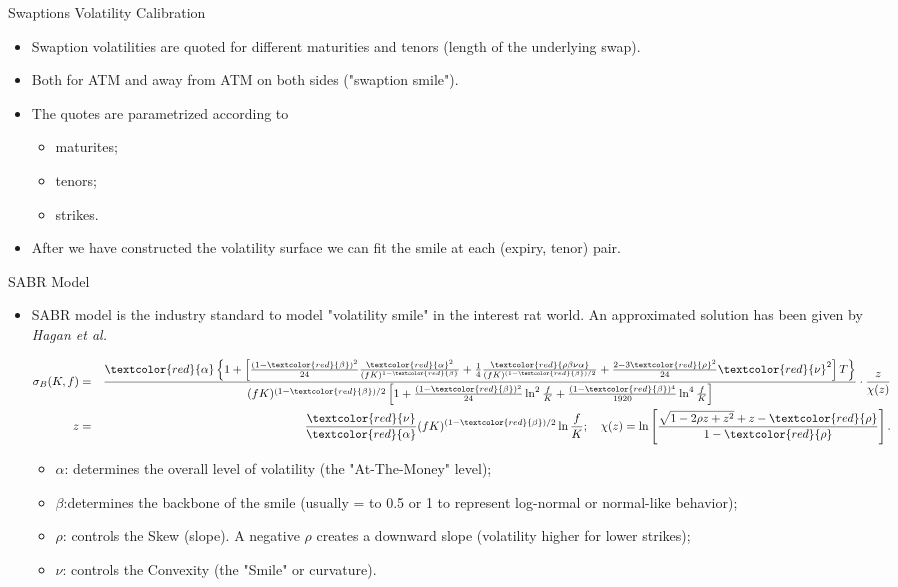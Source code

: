 \documentclass{beamer}
\begin{document}
\begin{frame}{Swaptions Volatility Calibration}
\begin{itemize}
\item Swaption volatilities are quoted for different maturities and tenors (length of the underlying swap).
\item Both for ATM and away from ATM on both sides ("swaption smile").
\item The quotes are parametrized according to
\begin{itemize}
	\item maturites;
	\item tenors;
	\item strikes.
\end{itemize}
\item After we have constructed the volatility surface we can fit the smile at each (expiry, tenor) pair.
\end{itemize}
\end{frame}

\begin{frame}{SABR Model}
\begin{itemize}
\item SABR model is the industry standard to model "volatility smile" in the interest rat world. An approximated solution has been given by \emph{Hagan et al.}

\begin{eqnarray} \sigma _{B}(K,f) &=&\frac{\textcolor{red}{\alpha} \left\{ 1+\left[ \frac{\left( 1-\textcolor{red}{\beta} \right) ^{2}}{24}\frac{\textcolor{red}{\alpha} ^{2}}{(fK)^{1-\textcolor{red}{\beta}}}+\frac{1}{4}\frac{\textcolor{red}{\rho \beta \nu\alpha}}{(fK)^{(1-\textcolor{red}{\beta})/2}}+\frac{2-3\textcolor{red}{\rho} ^{2}}{24}\textcolor{red}{\nu}^{2}\right] T\right\} }{(fK)^{(1-\textcolor{red}{\beta})/2}\left[ 1+\frac{(1-\textcolor{red}{\beta})^{2}}{24}\ln ^{2} \frac{f}{K}+\frac{(1-\textcolor{red}{\beta})^{4}}{1920}\ln^{4}\frac{f}{K}\right] } \cdot \frac{z}{\chi (z)} \notag \\ z &=&\frac{\textcolor{red}{\nu}}{\textcolor{red}{\alpha}}(fK)^{(1-\textcolor{red}{\beta})/2}\ln \frac{f}{K};\quad \notag \chi (z) =\ln \left[ \frac{\sqrt{1-2\rho z+z^{2}}+z-\textcolor{red}{\rho}}{1-\textcolor{red}{\rho}}\right] . \notag \end{eqnarray}

\begin{itemize}
	\item $\alpha$: determines the overall level of volatility (the "At-The-Money" level);
	\item $\beta$:determines the backbone of the smile (usually = to 0.5 or 1 to represent log-normal or normal-like behavior);
	\item $\rho$: controls the Skew (slope). A negative $\rho$ creates a downward slope (volatility higher for lower strikes);
	\item $\nu$: controls the Convexity (the "Smile" or curvature).
\end{itemize}
\end{itemize}
\end{frame}
\end{document}
